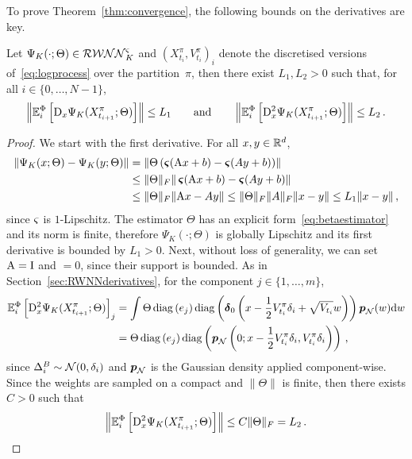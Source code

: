 To prove Theorem~\ref{thm:convergence},
the following bounds on the derivatives are key.
\begin{lemma}\label{lem:derivativeBounds}
Let $\Psi_K(\cdot; \Theta)\in\mathcal{RWNN}^{\varsigma}_K$ and $(X^\pi_{t_i}, V^\pi_{t_i})_{i}$ denote the discretised versions of~\eqref{eq:logprocess} over the partition~$\pi$, then there exist $L_1, L_2 > 0$ such that, 
for all $i\in\{0,\dots,N-1\}$,
$$
\left\|\mathbb{E}_i^\Phi\left[\mathrm{D}_{x}\Psi_K(X^\pi_{t_{i+1}}; \Theta)\right]\right\| \leq L_1 
\qquad \text{and} \qquad \left\|\mathbb{E}_i^\Phi\left[\mathrm{D}_{x}^2\Psi_K(X^\pi_{t_{i+1}}; \Theta)\right]\right\| \leq L_2\,.
$$
\end{lemma}
\begin{proof}
We start with the first derivative. 
For all $x,y\in\mathbb{R}^d$,
\begin{align*}
    \left\|\Psi_K(x; \Theta)-\Psi_K(y; \Theta)\right\| 
    &= \left\| \Theta \left(\operatorname{\boldsymbol\varsigma}(\mathrm{A} x+b)-\operatorname{\boldsymbol\varsigma}(Ay+b)\right) \right\| \\
    &\leq \|\Theta\|_F\|\operatorname{\boldsymbol\varsigma}(\mathrm{A} x+b)-\operatorname{\boldsymbol\varsigma}(Ay+b)\| \\
    &\leq \|\Theta\|_F\|\mathrm{A} x-Ay\| \leq \|\Theta\|_F\|A\|_F\|x-y\|
    \leq L_1\|x-y\|\,,
\end{align*}
since $\varsigma$ is $1$-Lipschitz. 
The estimator $\Theta$ has an explicit form~\eqref{eq:betaestimator} and its norm is finite, therefore $\Psi_K(\cdot; \Theta)$ is globally Lipschitz and its first derivative is bounded by $L_1>0$. 
Next, without loss of generality, we can set $\mathrm{A}=\mathrm{I}$ and $\bm=0$, since their support is bounded. 
As in Section~\ref{sec:RWNNderivatives}, 
for the component $j\in\{1,\dots,m\}$,
\begin{align*}
    \EE_i^\Phi\left[\Dx^2 \Psi_K(X^\pi_{t_{i+1}}; \Theta)\right]_j %
    &= \int \Theta\operatorname{diag}\left(e_{j}\right)\operatorname{diag}\left(\boldsymbol\delta_0\left(x-\frac12 V^\pi_{t_i}\Deli  + \sqrt{V_{t_i}}w\right)\right) \boldsymbol p_\Nn(w) \D w \\
    &= \Theta \operatorname{diag}\left(e_{j}\right)\operatorname{diag}\left( \boldsymbol p_\Nn\left(0; x-\frac12 V^\pi_{t_i}\Deli, V^\pi_{t_i}\Deli \right)\right)\,,
\end{align*}
since $\Delta^{B}_{i}\sim\mathcal{N}(0, \delta_{i})$ and $\boldsymbol p_{\mathcal{N}}$ is the Gaussian density applied component-wise. 
Since the weights are sampled on a compact and  $\|\Theta\|$ is finite, then there exists $C>0$ such that
$$
\left\|\mathbb{E}_i^\Phi\left[\mathrm{D}_{x}^2 \Psi_K(X^\pi_{t_{i+1}}; \Theta)\right]\right\| \leq C\|\Theta\|_F = L_2\,.
$$
\end{proof}
